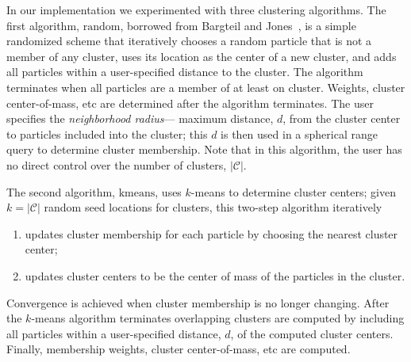 \documentclass[review]{acmsiggraph}
\begin{document}
In our implementation we experimented with three clustering algorithms.  The first algorithm, $\mathrm{random}$,
borrowed from Bargteil and Jones~, is a simple randomized scheme that iteratively
chooses a random particle that is not a member of any cluster,
uses its location as the center of a new cluster, and adds all particles within a user-specified distance to the cluster.  
The algorithm terminates when all particles are a member of at least on cluster.  Weights, cluster center-of-mass, etc are
determined after the algorithm terminates.  The user specifies the {\em neighborhood radius}--- 
maximum distance, $d$, from the cluster center to particles
included into the cluster; this $d$ is then used in a spherical range query to determine cluster membership.
Note that in this algorithm, the user has no direct control over the number of clusters, $|\mathcal{C}|$.

The second algorithm, $\mathrm{kmeans}$, uses $k$-means to determine cluster centers; given $k = |\mathcal{C}|$ 
random seed locations for clusters, this two-step algorithm iteratively
\begin{enumerate}
\item updates cluster membership for each particle by choosing the nearest cluster center;
\item updates cluster centers to be the center of mass of the particles in the cluster.
\end{enumerate}
Convergence is achieved when cluster membership is no longer changing.  
After the $k$-means algorithm terminates overlapping clusters are computed by including
all particles within a user-specified distance, $d$, of the computed cluster centers.  
Finally, membership weights, cluster center-of-mass, etc are computed.
\end{document}

